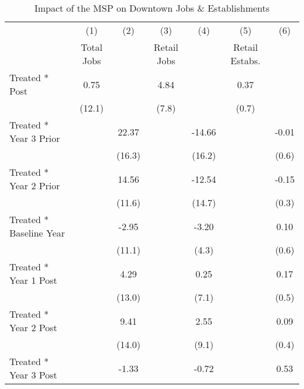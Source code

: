 \begin{table}[htbp]\centering
\def\sym#1{\ifmmode^{#1}\else\(^{#1}\)\fi}
\caption{Impact of the MSP on Downtown Jobs & Establishments}
\begin{tabular}{l*{6}{c}}
\toprule
            &\multicolumn{1}{c}{(1)}   &\multicolumn{1}{c}{(2)}   &\multicolumn{1}{c}{(3)}   &\multicolumn{1}{c}{(4)}   &\multicolumn{1}{c}{(5)}   &\multicolumn{1}{c}{(6)}   \\
            &  Total Jobs   &               & Retail Jobs   &               &Retail Estabs.   &               \\
\midrule
Treated * Post&        0.75   &               &        4.84   &               &        0.37   &               \\
            &      (12.1)   &               &       (7.8)   &               &       (0.7)   &               \\
Treated * Year 3 Prior&               &       22.37   &               &      -14.66   &               &       -0.01   \\
            &               &      (16.3)   &               &      (16.2)   &               &       (0.6)   \\
Treated * Year 2 Prior&               &       14.56   &               &      -12.54   &               &       -0.15   \\
            &               &      (11.6)   &               &      (14.7)   &               &       (0.3)   \\
Treated * Baseline Year&               &       -2.95   &               &       -3.20   &               &        0.10   \\
            &               &      (11.1)   &               &       (4.3)   &               &       (0.6)   \\
Treated * Year 1 Post&               &        4.29   &               &        0.25   &               &        0.17   \\
            &               &      (13.0)   &               &       (7.1)   &               &       (0.5)   \\
Treated * Year 2 Post&               &        9.41   &               &        2.55   &               &        0.09   \\
            &               &      (14.0)   &               &       (9.1)   &               &       (0.4)   \\
Treated * Year 3 Post&               &       -1.33   &               &       -0.72   &               &        0.53   \\

\end{tabular}
\end{table}

